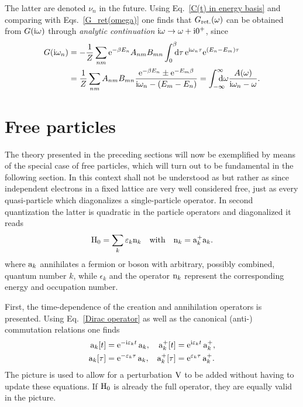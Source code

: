 The latter are denoted $\nu_n$ in the future. Using Eq.~\ref{C(t) in energy
basis} and comparing with Eqs.~\ref{G_ret(omega)} one finds that $G \sb{\text{ret.}}
(\omega)$ can be obtained from $G(\mathrm i \omega)$ through \emph{analytic
continuation} $\mathrm i \omega \rightarrow \omega + \mathrm i 0^+$, since
%
\begin{equation} \label{G(i omega_n)}
    \begin{split}
        G(\I \omega_n) &= -\frac 1 Z \sum_{n m}
        \E^{-\beta E_n} A_{n m} B_{m n}
        \int \from 0 \till \beta \D \tau \,
        \E^{\I \omega_n \tau} \E^{(E_n - E_m) \tau} \\
        &=
        \frac 1 Z \sum_{n m} A_{n m} B_{m n}
        \frac{\E^{-\beta E_n} \pm \E^{-E_m \beta}}{\I \omega_n - (E_m - E_n)}
        = \int \from{-\infty} \till \infty \D \omega
        \frac{A(\omega)}{\I \omega_n - \omega}.
    \end{split}
\end{equation}

\section{Free particles}
\label{free particles}

The theory presented in the preceding sections will now be exemplified by means
of the special case of free particles, which will turn out to be fundamental in
the following section. In this context  shall not be understood as
 but rather as  since independent
 electrons in a fixed lattice are very well considered free, just as
every quasi-particle which diagonalizes a single-particle 
operator. In second quantization the latter is quadratic in the particle
operators and diagonalized it reads
%
\begin{equation*}
    \mathrm H_0 = \sum_k \varepsilon_k \mathrm n_k
    \quad \text{with} \quad
    \mathrm n_k = \mathrm a_k^+ \mathrm a_k.
\end{equation*}
%
where $\mathrm a_k$ annihilates a fermion or boson with arbitrary, possibly
combined, quantum number $k$, while $\epsilon_k$ and the operator $\mathrm n_k$
represent the corresponding energy and occupation number.

First, the time-dependence of the creation and annihilation operators is
presented. Using Eq.~\ref{Dirac operator} as well as the canonical (anti-)
commutation relations one finds
%
\begin{equation} \label{time-dependent ladder operators}
    \begin{aligned}
        \mathrm a_k[t] &= \mathrm e^{-\mathrm i \varepsilon_k t} \, \mathrm a_k, &
        \mathrm a_k^+[t] &= \mathrm e^{\mathrm i \varepsilon_k t} \, \mathrm a_k^+, \\
        \mathrm a_k[\tau] &= \mathrm e^{-\varepsilon_k \tau} \, \mathrm a_k, &
        \mathrm a_k^+[\tau] &= \mathrm e^{\varepsilon_k \tau} \, \mathrm a_k^+.
    \end{aligned}
\end{equation}
%
The  picture is used to allow for a perturbation $\mathrm V$ to be added
without having to update these equations. If $\mathrm H_0$ is already the full
 operator, they are equally valid in the 
picture.

